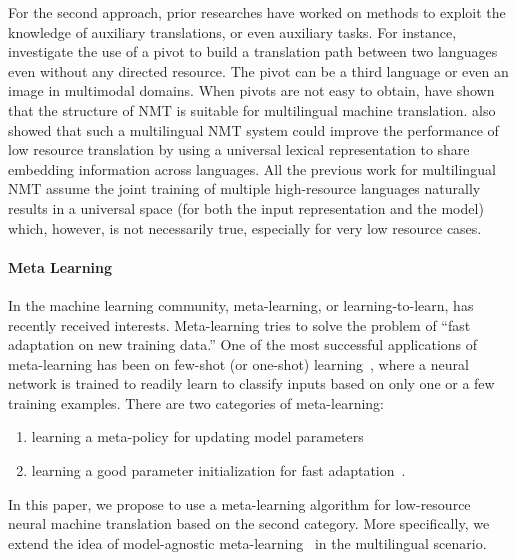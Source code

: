For the second approach, prior researches have worked on methods to exploit the knowledge of auxiliary translations, or even auxiliary tasks. For instance, \citet{cheng2016neural,chen2017teacher,lee2017emergent,chen2018zero} investigate the use of a pivot to build a translation path between two languages even without any directed resource. The pivot can be a third language or even an image in multimodal domains. When pivots are not easy to obtain, \citet{firat2016multi,lee2016fully,johnson2016google} have shown that the structure of NMT is suitable for multilingual machine translation. \citet{gu2018universal} also showed that such a multilingual NMT system could improve the performance of low resource translation by using a universal lexical representation to share embedding information across languages. 
All the previous work for multilingual NMT assume the joint training of multiple high-resource languages naturally results in a universal space (for both the input representation and the model) which, however, is not necessarily true, especially for very low resource cases. 

\paragraph{Meta Learning}

In the machine learning community, meta-learning, or learning-to-learn, has recently received interests. Meta-learning tries to solve the problem of “fast adaptation on new training data.”  One of the most successful applications of meta-learning has been on few-shot (or one-shot) learning~\citep{lake2015human}, where a neural network is trained to readily learn to classify inputs based on only one or a few training examples. There are two categories of meta-learning:
\begin{enumerate}
    \item learning a meta-policy for updating model parameters~\citep[see, e.g.,][]{andrychowicz2016learning,ha2016hypernetworks,mishra2017meta}
    \item  learning a good parameter initialization for fast adaptation~\citep[see, e.g.,][]{finn2017model,vinyals2016matching,snell2017prototypical}. 
\end{enumerate}
In this paper, we propose to use a meta-learning algorithm for low-resource neural machine translation based on the second category. More specifically, we extend the idea of model-agnostic meta-learning~\citep[MAML,][]{finn2017model} in the multilingual scenario.

